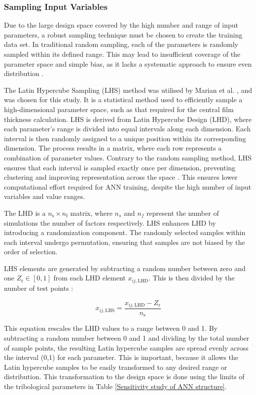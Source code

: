 \subsubsection{Sampling Input Variables}

Due to the large design space covered by the high number and range of input parameters, a robust sampling technique must be chosen to create the training data set. In traditional random sampling, each of the parameters is randomly sampled within its defined range. This may lead to insufficient coverage of the parameter space and simple bias, as it lacks a systematic approach to ensure even distribution \cite{Preece2016}.

The Latin Hypercube Sampling (LHS) method was utilised by Marian et al. \cite{Marian2022}, and was chosen for this study. It is a statistical method used to efficiently sample a high-dimensional parameter space, such as that required for the central film thickness calculation. LHS is derived from Latin Hypercube Design (LHD), where each parameter’s range is divided into equal intervals along each dimension. Each interval is then randomly assigned to a unique position within its corresponding dimension. The process results in a matrix, where each row represents a combination of parameter values. Contrary to the random sampling method, LHS ensures that each interval is sampled exactly once per dimension, preventing clustering and improving representation across the space \cite{Preece2016}. This ensures lower computational effort required for ANN training, despite the high number of input variables and value ranges.

The LHD is a $n_{\mathrm{s}} \times n_{\mathrm{f}}$ matrix, where $n_s$ and $n_f$ represent the number of simulations the number of factors respectively. LHS enhances LHD by introducing a randomization component. The randomly selected samples within each interval undergo permutation, ensuring that samples are not biased by the order of selection.

LHS elements are generated by subtracting a random number between zero and one $Z_{\mathrm{r}}\in[0,1]$ from each LHD element $x_{i j, \mathrm{LHD}}$. This is then divided by the number of test points \cite{Siebertz2010}:

\begin{equation}\label{LHS}
	x_{i j, \mathrm{LHS}}=\frac{x_{i j, \mathrm{LHD}}-Z_{\mathrm{r}}}{n_{\mathrm{s}}}
\end{equation}

This equation rescales the LHD values to a range between 0 and 1. By subtracting a random number between 0 and 1 and dividing by the total number of sample points, the resulting Latin hypercube samples are spread evenly across the interval (0,1) for each parameter. This is important, because it allows the Latin hypercube samples to be easily transformed to any desired range or distribution. This transformation to the design space is done using the limits of the tribological parameters in Table \ref{Sensitivity study of ANN structure}.

